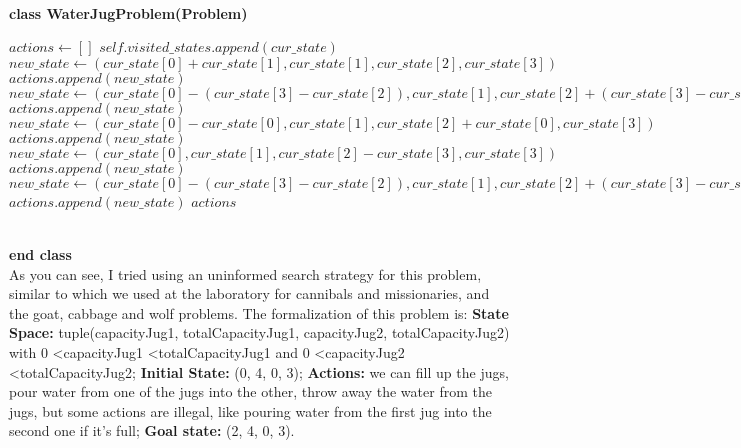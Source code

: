 \documentclass[14pt]{article}
\begin{document}
\\\textbf{class WaterJugProblem(Problem)}
\begin{algorithmic}
\State $actions \gets [ ]$
\State $self.visited\_states.append(cur\_state)$
    \State $new\_state \gets (cur\_state[0] + cur\_state[1], cur\_state[1], cur\_state[2], cur\_state[3])$
        \State $actions.append(new\_state)$
    \EndIf
\EndIf
{}
    \State $new\_state \gets (cur\_state[0] - (cur\_state[3] - cur\_state[2]), cur\_state[1], cur\_state[2] + (cur\_state[3] - cur\_state[2]), cur\_state[3])$
        \State $actions.append(new\_state)$
    \EndIf
    \State $new\_state \gets (cur\_state[0] - cur\_state[0], cur\_state[1], cur\_state[2] + cur\_state[0], cur\_state[3])$
        \State $actions.append(new\_state)$
    \EndIf
\EndIf
{}
    \State $new\_state \gets (cur\_state[0], cur\_state[1], cur\_state[2] - cur\_state[3], cur\_state[3])$
        \State $actions.append(new\_state)$
    \EndIf
\EndIf
{}
    \State $new\_state \gets (cur\_state[0] - (cur\_state[3] - cur\_state[2]), cur\_state[1], cur\_state[2] + (cur\_state[3] - cur\_state[2]), cur\_state[3])$
        \State $actions.append(new\_state)$
    \EndIf
\EndIf
\State \Return $actions$
\EndFunction
\end{algorithmic}
\\\textbf{end class}
\vspace{2.5 mm}
\\As you can see, I tried using an uninformed search strategy for this problem, similar to which we used at the laboratory for cannibals and missionaries, and the goat, cabbage and wolf problems. The formalization of this problem is: \textbf{State Space:} tuple(capacityJug1, totalCapacityJug1, capacityJug2, totalCapacityJug2) with 0 \textless capacityJug1 \textless totalCapacityJug1 and 0 \textless capacityJug2 \textless totalCapacityJug2; \textbf{Initial State:} (0, 4, 0, 3); \textbf{Actions:} we can fill up the jugs, pour water from one of the jugs into the other, throw away the water from the jugs, but some actions are illegal, like pouring water from the first jug into the second one if it's full; \textbf{Goal state:} (2, 4, 0, 3).
\end{document}
